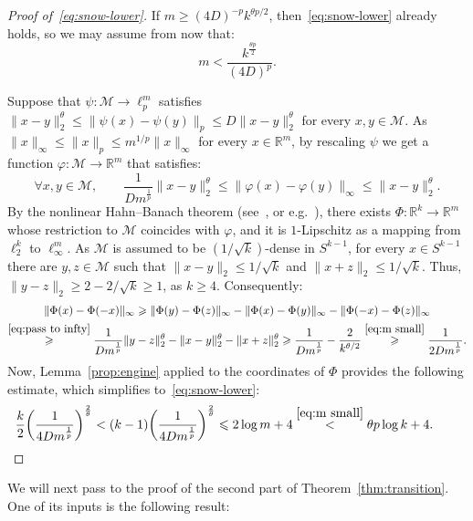 \documentclass[11pt,reqno]{amsart}
\newcommand{\R}{\mathbb{R}}
\newcommand{\norm}[1]{\| #1 \|}
\renewcommand{\le}{\leqslant}
\renewcommand{\ge}{\geqslant}
\newcommand{\MM}{\mathcal{M}}
\newcommand{\f}{\varphi}
\newcommand{\1}{\mathbf{1}}
\begin{document}
\begin{proof}[Proof of~\eqref{eq:snow-lower}] If $m\ge (4D)^{-p}k^{\theta p/2}$, then~\eqref{eq:snow-lower} already holds, so we may assume from now that: 
\begin{equation}\label{eq:m small}
m<\frac{k^{\frac{\theta p}{2}}}{(4D)^p}.
\end{equation}


Suppose that $\psi:\MM\to \ell_p^m$ satisfies $\|x-y\|_2^\theta \le \|\psi(x)-\psi(y)\|_p\le D\|x-y\|_2^\theta$ for every $x,y\in \MM$. As $\|x\|_\infty\le \|x\|_p\le m^{1/p}\|x\|_\infty$ for every $x\in \R^m$, by rescaling $\psi$ we get a function $\f:\MM\to \R^m$ that satisfies:
\begin{equation}\label{eq:pass to infty}
\forall x,y\in \MM,\qquad \frac{1}{Dm^{\frac{1}{p}}}\|x-y\|_2^\theta\le \|\f(x)-\f(y)\|_\infty\le \|x-y\|_2^\theta.
\end{equation}
By the nonlinear Hahn--Banach theorem (see~\cite{Mac34}, or e.g.~\cite[Chapter~1]{BL00}), there exists  $\Phi:\R^k\to \R^m$ whose restriction to $\MM$ coincides with $\f$, and it is $1$-Lipschitz as a mapping from $\ell_2^k$ to $\ell_\infty^m$. As $\MM$ is assumed to be $(1/\sqrt{k})$-dense in $S^{k-1}$, for every $x\in S^{k-1}$ there are $y,z\in \MM$ such that $\|x-y\|_2\le 1/\sqrt{k}$ and $\|x+z\|_2\le 1/\sqrt{k}$. Thus, $\|y-z\|_2\ge 2-2/\sqrt{k}\ge 1$, as $k\ge 4$. Consequently:
\begin{multline*}
\norm{\Phi(x) - \Phi(-x)}_\infty \ge \norm{\Phi(y) - \Phi(z)}_\infty - \norm{\Phi(x) - \Phi(y)}_\infty - \norm{\Phi(-x) - \Phi(z)}_\infty\\ \stackrel{\eqref{eq:pass to infty}}{\ge} \frac{1}{Dm^{\frac{1}{p}}} \norm{y-z}_2^\theta-\|x-y\|_2^\theta-\|x+z\|_2^\theta 
\ge \frac{1}{Dm^{\frac{1}{p}}} - \frac{2}{k^{\theta/2}} \stackrel{\eqref{eq:m small}}{\ge} \frac{1}{2Dm^{\frac{1}{p}}} .
\end{multline*}
Now, Lemma~\ref{prop:engine}  applied to the coordinates of $\Phi$ provides the following estimate, which simplifies to~\eqref{eq:snow-lower}:
\begin{equation*}
\frac{k}{2}\bigg(\frac{1}{4Dm^{\frac{1}{p}}}\bigg)^{\frac{2}{\theta}}<(k-1)\bigg(\frac{1}{4Dm^{\frac{1}{p}}}\bigg)^{\frac{2}{\theta}}\le 2\log m+4\stackrel{\eqref{eq:m small}}{<}\theta p \log k +4.\tag*{\qedhere}
\end{equation*}
\end{proof}

\smallskip

We will next pass to the proof of the second part of Theorem~\ref{thm:transition}. One of its inputs is the following result:
\end{document}
